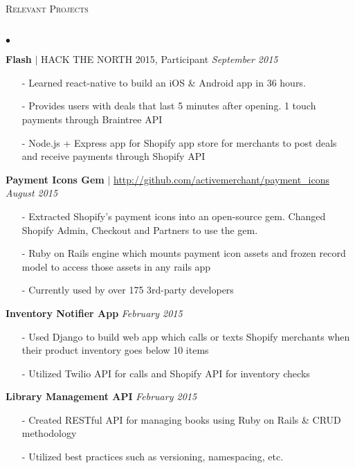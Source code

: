 \documentclass[10pt]{article}
\newcommand{\lineunder}{\vspace*{-8pt} \\ \hspace*{-18pt} \hrulefill \\}
\newcommand{\header}[1]{{\hspace*{-15pt}\vspace*{6pt} \textsc{#1}} \vspace*{-6pt} \lineunder}
\newenvironment{achievements}{\begin{list}{$\bullet$}{\topsep 0pt \itemsep -1.5pt \leftmargin 5pt}}{\vspace*{4pt}\end{list}}
\begin{document}
\vspace{6pt}

\header{\normalsize Relevant Projects}
\begin{achievements}
\def\UrlFont{\em}
\item \textbf{Flash} {$|$ \scriptsize HACK THE NORTH 2015, Participant}  \hfill \textit {September 2015}
\begin{itemize}
\item[-]Learned react-native to build an iOS \& Android app in 36 hours. 
\item[-]Provides users with deals that last 5 minutes after opening. 1 touch payments through Braintree API
\item[-]Node.js + Express app for Shopify app store for merchants to post deals and receive payments through Shopify API
\end{itemize}
\vspace{2pt}
\item \textbf{Payment Icons Gem} $|$ \url{http://github.com/activemerchant/payment_icons} \hfill \textit {August 2015}
\begin{itemize}
\item[-]Extracted Shopify's payment icons into an open-source gem. Changed Shopify Admin, Checkout and Partners to use the gem.
\item[-]Ruby on Rails engine which mounts payment icon assets and frozen record model to access those assets in any rails app
\item[-]Currently used by over 175 3rd-party developers
\end{itemize}
\vspace{2pt}
\item \textbf{Inventory Notifier App}  \hfill \textit {February 2015}
\begin{itemize}
\item[-]Used Django to build web app which calls or texts Shopify merchants when their product inventory goes below 10 items
\item[-]Utilized Twilio API for calls and Shopify API for inventory checks
\end{itemize}
\vspace{2pt}
\item \textbf{Library Management API}  \hfill \textit {February 2015}
\begin{itemize}
\item[-]Created RESTful API for managing books using Ruby on Rails \& CRUD methodology
\item[-]Utilized best practices such as versioning, namespacing, etc.

\end{itemize}
\end{achievements}
\end{document}
